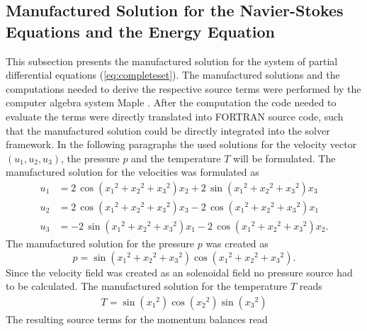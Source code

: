 \subsection{Manufactured Solution for the Navier-Stokes Equations and the Energy Equation}
\label{sec:manufacturedsolution}

This subsection presents the manufactured solution for the system of partial differential equations (\ref{eq:completeset}). The manufactured solutions and the computations needed to derive the respective source terms were performed by the computer algebra system Maple \textregistered \cite{maple}. After the computation the code needed to evaluate the terms were directly translated into FORTRAN source code, such that the manufactured solution could be directly integrated into the solver framework. In the following paragraphs the used solutions for the velocity vector \((u_1,u_2,u_3)\), the pressure \(p\) and the temperature \(T\) will be formulated. The manufactured solution for the velocities was formulated as
\begin{align*}
  u_1 &= 2\,\cos \left( {x_1}^{2}+{x_2}^{2}+{x_3}^{2} \right) x_2+2\,\sin \left( {x_1}^{2}+{x_2}^{2}+{x_3}^{2} \right) x_3 \\[1.0em]
  u_2 &= 2\,\cos \left( {x_1}^{2}+{x_2}^{2}+{x_3}^{2} \right) x_3-2\,\cos \left( {x_1}^{2 }+{x_2}^{2}+{x_3}^{2} \right) x_1 \\[1.0em]
  u_3 &= -2\,\sin \left( {x_1}^{2}+{x_2}^{2}+{x_3}^{2} \right) x_1-2\,\cos \left( {x_1}^{ 2}+{x_2}^{2}+{x_3}^{2} \right) x_2.
\end{align*}
The manufactured solution for the pressure \(p\) was created as
\begin{displaymath}
  p = \sin \left( {x_1}^{2}+{x_2}^{2}+{x_3}^{2} \right) \cos \left( {x_1}^{2}+ {x_2}^{2 }+{x_3}^{2} \right).
\end{displaymath}
Since the velocity field was created as an solenoidal field no pressure source had to be calculated. The manufactured solution for the temperature \(T\) reads
\begin{align*}
  T=\sin \left( {x_1}^{2} \right) \cos \left( {x_2}^{2} \right) \sin \left( {x_3 }^{2} \right)
\end{align*}
The resulting source terms for the momentum balances read
